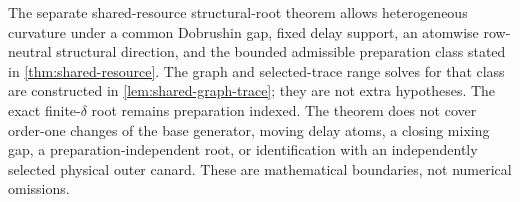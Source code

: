 The separate shared-resource structural-root theorem allows heterogeneous
curvature under a common Dobrushin gap, fixed delay support, an atomwise
row-neutral structural direction, and the bounded admissible preparation
class stated in \cref{thm:shared-resource}.  The graph and selected-trace
range solves for that class are constructed in
\cref{lem:shared-graph-trace}; they are not extra hypotheses.  The exact
finite-\(\delta\) root remains preparation indexed.  The theorem does not
cover order-one changes of the base generator, moving delay atoms, a closing
mixing gap, a preparation-independent root, or identification with an
independently selected physical outer canard.  These are mathematical
boundaries, not numerical omissions.
